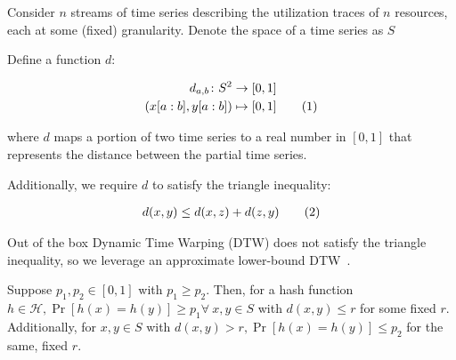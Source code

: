 \documentclass{report}
\newcommand\numberthis{\addtocounter{equation}{1}\tag{\theequation}}
\begin{document}
Consider $n$ streams of time series describing the utilization traces of $n$ resources, each at some (fixed) granularity.
Denote the space of a time series as $S$

Define a function $d$:

\begin{align*}
    d_{a,b} \colon S^2 &\to [0,1]\\
    (x[a:b],y[a:b]) &\mapsto [0,1] \numberthis
\end{align*}

where $d$ maps a portion of two time series to a real number in $[0,1]$ that represents the distance between the partial time series.

Additionally, we require $d$ to satisfy the triangle inequality:

\begin{align*}
    d(x,y) \le d(x,z) + d(z,y) \numberthis
\end{align*}

Out of the box Dynamic Time Warping (DTW) does not satisfy the triangle inequality, so we leverage an approximate lower-bound DTW~\cite{Lemire:2009:FRT:1542560.1542887}.

Suppose $p_1, p_2 \in [0,1]$ with $p_1 \ge p_2$.
Then, for a hash function $h \in \mathcal{H}, \Pr[h(x) = h(y)] \ge p_1 \forall~x,y \in S$ with $d(x,y) \le r$ for some fixed $r$.
Additionally, for $x,y \in S$ with $d(x,y) > r, \Pr[h(x) = h(y)] \le p_2$ for the same, fixed $r$.



\end{document}
